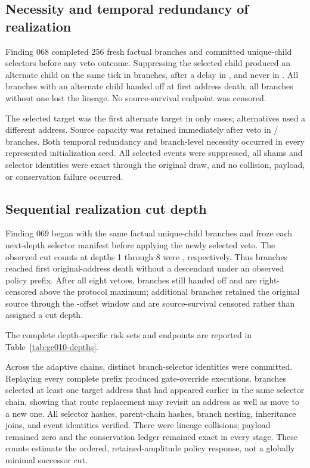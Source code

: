\subsection{Necessity and temporal redundancy of realization}

Finding 068 completed 256 fresh factual branches and committed
\GCNineEligible{} unique-child selectors before any veto outcome. Suppressing
the selected child produced an alternate child on the same tick in
\GCNineSameTick{} branches, after a delay in \GCNineDelayed{}, and never in
\GCNineNoAlternate{}. All \GCNineHandoffs{} branches with an alternate child
handed off at first address death; all \GCNineLosses{} branches without one lost
the lineage. No source-survival endpoint was censored.

The selected target was the first alternate target in only
\GCNineFirstSameTarget{} cases; \GCNineFirstDifferentTarget{} alternatives used
a different address. Source capacity was retained immediately after veto in
\GCNineCapacityRetained{}/\GCNineEligible{} branches. Both temporal redundancy
and branch-level necessity occurred in every represented initialization seed.
All selected events were suppressed, all shams and selector identities were
exact through the original draw, and no collision, payload, or conservation
failure occurred.

\subsection{Sequential realization cut depth}

Finding 069 began with the same \GCTenInitial{} factual unique-child branches
and froze each next-depth selector manifest before applying the newly selected
veto. The observed cut counts at depths 1 through 8 were
\GCTenDepthCounts{}, respectively. Thus \GCTenCutTotal{} branches reached first
original-address death without a descendant under an observed policy prefix.
After all eight vetoes, \GCTenAboveMax{} branches still handed off and are
right-censored above the protocol maximum; \GCTenSourceCensored{} additional
branches retained the original source through the \GCTenFixedHorizon{}-offset
window and are source-survival censored rather than assigned a cut depth.

The complete depth-specific risk sets and endpoints are reported in
Table~\ref{tab:gc010-depths}.



Across the adaptive chains, \GCTenVetoEvents{} distinct branch-selector
identities were committed. Replaying every complete prefix produced
\GCTenOverrideExecutions{} gate-override executions. \GCTenTargetReuseBranches{}
branches selected at least one target address that had appeared earlier in the
same selector chain, showing that route replacement may revisit an address as
well as move to a new one. All selector hashes, parent-chain hashes, branch
nesting, inheritance joins, and event identities verified. There were
\GCTenCollisions{} lineage collisions; payload remained zero and the
conservation ledger remained exact in every stage. These counts estimate the
ordered, retained-amplitude policy response, not a globally minimal successor
cut.

